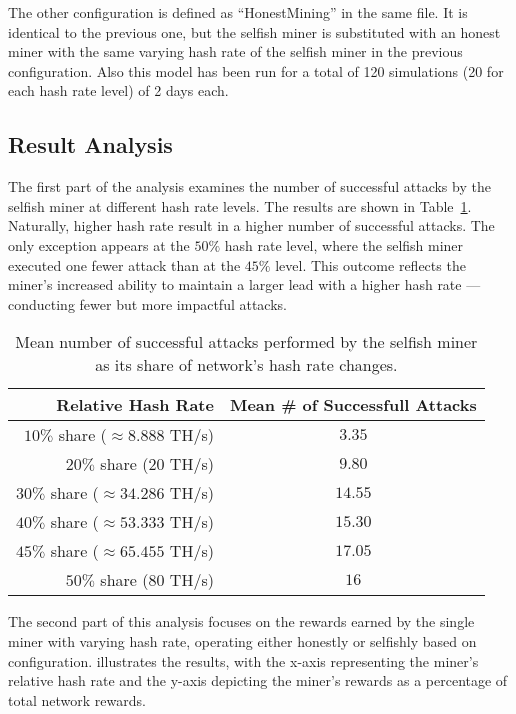 The other configuration is defined as ``HonestMining'' in the same file. It is
identical to the previous one, but the selfish miner is substituted with an
honest miner with the same varying hash rate of the selfish miner in the
previous configuration. Also this model has been run for a total of 120
simulations (20 for each hash rate level) of 2 days each.

\subsection{Result Analysis}\label{subsec:selfish-analysis}

The first part of the analysis examines the number of successful attacks
by the selfish miner at different hash rate levels. The results
are shown in Table~\ref{tab:selfish-attacks}. Naturally, higher hash rate
result in a higher number of successful attacks. The only exception appears at
the \(50\%\) hash rate level, where the selfish miner executed one fewer attack
than at the \(45\%\) level. This outcome reflects the miner's increased ability
to maintain a larger lead with a higher hash rate --- conducting fewer but more
impactful attacks.

\begin{table}[tbhp]
	\centering
	\begin{tabular}{|r|c|}
		\toprule
		Relative Hash Rate & Mean \# of Successfull Attacks \\
		\midrule
		\(10\%\) share (\(\approx8.888\) TH/s) & \(3.35\) \\[6pt]
		\(20\%\) share (\(20\) TH/s) & \(9.80\) \\[6pt]
		\(30\%\) share (\(\approx34.286\) TH/s) & \(14.55\) \\[6pt]
		\(40\%\) share (\(\approx53.333\) TH/s) & \(15.30\) \\[6pt]
		\(45\%\) share (\(\approx65.455\) TH/s) & \(17.05\) \\[6pt]
		\(50\%\) share (\(80\) TH/s) & \(16\) \\
		\bottomrule
	\end{tabular}
	\caption{Mean number of successful attacks performed by the selfish
	miner as its share of network's hash rate
	changes.}\label{tab:selfish-attacks}
\end{table}

The second part of this analysis focuses on the rewards earned by the single
miner with varying hash rate, operating either honestly or selfishly based on
configuration.  illustrates the results, with the
x-axis representing the miner's relative hash rate and the y-axis depicting the
miner's rewards as a percentage of total network rewards.

